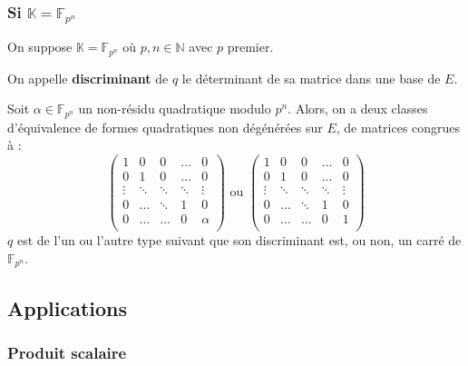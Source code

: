   \subsubsection{Si \texorpdfstring{$\mathbb{K} = \mathbb{F}_{p^n}$}{K = Fₚₙ}}

  On suppose $\mathbb{K} = \mathbb{F}_{p^n}$ où $p, n \in \mathbb{N}$ avec $p$ premier.


  \begin{definition}
    On appelle \textbf{discriminant} de $q$ le déterminant de sa matrice dans une base de $E$.
  \end{definition}

  \begin{theorem}
    Soit $\alpha \in \mathbb{F}_{p^n}$ un non-résidu quadratique modulo $p^n$. Alors, on a deux classes d'équivalence de formes quadratiques non dégénérées sur $E$, de matrices congrues à :
    \[
      \begin{pmatrix}
        1 & 0 & 0 & \dots & 0 \\
        0 & 1 & 0 & \dots & 0 \\
        \vdots & \ddots & \ddots & \ddots & \vdots \\
        0 & \dots & \ddots & 1 & 0 \\
        0 & \dots & \dots & 0 & \alpha \\
      \end{pmatrix}
      \text{ ou }
      \begin{pmatrix}
        1 & 0 & 0 & \dots & 0 \\
        0 & 1 & 0 & \dots & 0 \\
        \vdots & \ddots & \ddots & \ddots & \vdots \\
        0 & \dots & \ddots & 1 & 0 \\
        0 & \dots & \dots & 0 & 1 \\
      \end{pmatrix}
    \]
    $q$ est de l'un ou l'autre type suivant que son discriminant est, ou non, un carré de $\mathbb{F}_{p^n}$.
  \end{theorem}

  \subsection{Applications}

  \subsubsection{Produit scalaire}

